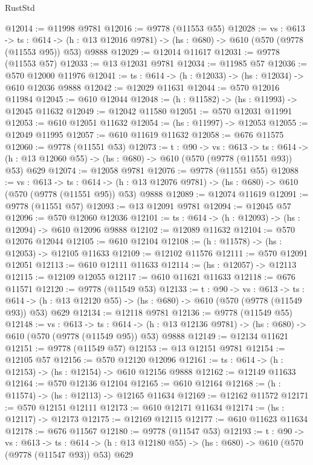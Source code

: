 \begin{lexlean}{RustStd}
\begin{coremodule}
@12014 := @11998 @9781
@12016 := @9778 (@11553 @55)
@12028 := {vs : @613} ->
  {ts : @614} -> (h : @13 @12016 @9781) -> (hs : @680) -> @610 (@570 (@9778 (@11553 @95)) @53) @9888
@12029 := @12014 @11617
@12031 := @9778 (@11553 @57)
@12033 := @13 @12031 @9781
@12034 := @11985 @57
@12036 := @570 @12000 @11976
@12041 := {ts : @614} -> (h : @12033) -> (hs : @12034) -> @610 @12036 @9888
@12042 := @12029 @11631
@12044 := @570 @12016 @11984
@12045 := @610 @12044
@12048 := (h : @11582) -> (hs : @11993) -> @12045 @11632
@12049 := @12042 @11580
@12051 := @570 @12031 @11991
@12053 := @610 @12051 @11632
@12054 := (hs : @11997) -> @12053
@12055 := @12049 @11995
@12057 := @610 @11619 @11632
@12058 := @676 @11575
@12060 := @9778 (@11551 @53)
@12073 := {t : @90} ->
  {vs : @613} ->
  {ts : @614} -> (h : @13 @12060 @55) -> (hs : @680) -> @610 (@570 (@9778 (@11551 @93)) @53) @629
@12074 := @12058 @9781
@12076 := @9778 (@11551 @55)
@12088 := {vs : @613} ->
  {ts : @614} -> (h : @13 @12076 @9781) -> (hs : @680) -> @610 (@570 (@9778 (@11551 @95)) @53) @9888
@12089 := @12074 @11619
@12091 := @9778 (@11551 @57)
@12093 := @13 @12091 @9781
@12094 := @12045 @57
@12096 := @570 @12060 @12036
@12101 := {ts : @614} -> (h : @12093) -> (hs : @12094) -> @610 @12096 @9888
@12102 := @12089 @11632
@12104 := @570 @12076 @12044
@12105 := @610 @12104
@12108 := (h : @11578) -> (hs : @12053) -> @12105 @11633
@12109 := @12102 @11576
@12111 := @570 @12091 @12051
@12113 := @610 @12111 @11633
@12114 := (hs : @12057) -> @12113
@12115 := @12109 @12055
@12117 := @610 @11621 @11633
@12118 := @676 @11571
@12120 := @9778 (@11549 @53)
@12133 := {t : @90} ->
  {vs : @613} ->
  {ts : @614} -> (h : @13 @12120 @55) -> (hs : @680) -> @610 (@570 (@9778 (@11549 @93)) @53) @629
@12134 := @12118 @9781
@12136 := @9778 (@11549 @55)
@12148 := {vs : @613} ->
  {ts : @614} -> (h : @13 @12136 @9781) -> (hs : @680) -> @610 (@570 (@9778 (@11549 @95)) @53) @9888
@12149 := @12134 @11621
@12151 := @9778 (@11549 @57)
@12153 := @13 @12151 @9781
@12154 := @12105 @57
@12156 := @570 @12120 @12096
@12161 := {ts : @614} -> (h : @12153) -> (hs : @12154) -> @610 @12156 @9888
@12162 := @12149 @11633
@12164 := @570 @12136 @12104
@12165 := @610 @12164
@12168 := (h : @11574) -> (hs : @12113) -> @12165 @11634
@12169 := @12162 @11572
@12171 := @570 @12151 @12111
@12173 := @610 @12171 @11634
@12174 := (hs : @12117) -> @12173
@12175 := @12169 @12115
@12177 := @610 @11623 @11634
@12178 := @676 @11567
@12180 := @9778 (@11547 @53)
@12193 := {t : @90} ->
  {vs : @613} ->
  {ts : @614} -> (h : @13 @12180 @55) -> (hs : @680) -> @610 (@570 (@9778 (@11547 @93)) @53) @629

\end{coremodule}
\end{lexlean}
